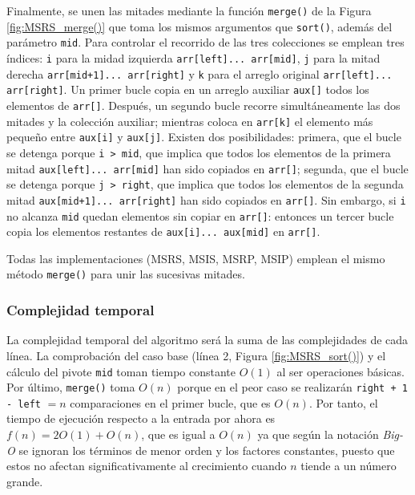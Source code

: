 \documentclass[titlepage]{article}
\begin{document}
Finalmente, se unen las mitades mediante la función \lstinline|merge()| de la Figura \ref{fig:MSRS_merge()} que toma los mismos argumentos que \lstinline|sort()|, además del parámetro \lstinline|mid|. Para controlar el recorrido de las tres colecciones se emplean tres índices: \lstinline|i| para la midad izquierda \lstinline|arr[left]... arr[mid]|, \lstinline|j| para la mitad derecha \lstinline|arr[mid+1]... arr[right]| y \lstinline|k| para el arreglo original \lstinline|arr[left]... arr[right]|. Un primer bucle copia en un arreglo auxiliar \lstinline|aux[]| todos los elementos de \lstinline|arr[]|. Después, un segundo bucle recorre simultáneamente las dos mitades y la colección auxiliar; mientras coloca en \lstinline|arr[k]| el elemento más pequeño entre \lstinline|aux[i]| y \lstinline|aux[j]|. Existen dos posibilidades: primera, que el bucle se detenga porque \lstinline|i > mid|, que implica que todos los elementos de la primera mitad \lstinline|aux[left]... arr[mid]| han sido copiados en \lstinline|arr[]|; segunda, que el bucle se detenga porque \lstinline|j > right|, que implica que todos los elementos de la segunda mitad \lstinline|aux[mid+1]... arr[right]| han sido copiados en \lstinline|arr[]|. Sin embargo, si \lstinline|i| no alcanza \lstinline|mid| quedan elementos sin copiar en \lstinline|arr[]|: entonces un tercer bucle copia los elementos restantes de \lstinline|aux[i]... aux[mid]| en \lstinline|arr[]|.

Todas las implementaciones (MSRS, MSIS, MSRP, MSIP) emplean el mismo método \lstinline|merge()| para unir las sucesivas mitades.

\subsubsection{Complejidad temporal} %

La complejidad temporal del algoritmo será la suma de las complejidades de cada línea. La comprobación del caso base (línea 2, Figura \ref{fig:MSRS_sort()}) y el cálculo del pivote \lstinline|mid| toman tiempo constante \(O(1)\) al ser operaciones básicas. Por último, \lstinline|merge()| toma \(O(n)\) porque en el peor caso se realizarán \lstinline|right + 1 - left| \(=n\) comparaciones en el primer bucle, que es \(O(n)\). Por tanto, el tiempo de ejecución respecto a la entrada por ahora es \(f(n) = 2O(1) + O(n)\), que es igual a \(O(n)\) ya que según la notación \textit{Big-O} se ignoran los términos de menor orden y los factores constantes, puesto que estos no afectan significativamente al crecimiento cuando \(n\) tiende a un número grande.
\end{document}

